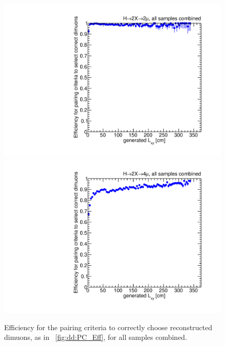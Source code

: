 \begin{figure}[p]
  \centering
  \includegraphics[width=\DSquareWidth]{figures/displaced/PC_Lxy_2Mu2J_Global.pdf}
  \hspace*{-2em}
  \includegraphics[width=\DSquareWidth]{figures/displaced/PC_Lxy_4Mu_Global.pdf}
  \caption[Efficiency for the pairing criteria to correctly choose reconstructed dimuons.]{Efficiency for the pairing criteria to correctly choose reconstructed dimuons, as in \Fig~\ref{fig:dd:PC_Eff}, for all samples combined.}
  \label{fig:dd:PC_Eff_Global}
\end{figure}

